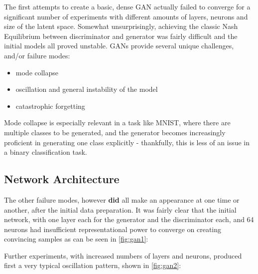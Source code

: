 The first attempts to create a basic, dense \ac{GAN} actually failed to converge for a significant number of experiments with different amounts of layers, neurons and size of the latent space. Somewhat unsurprisingly, achieving the classic Nash Equilibrium between discriminator and generator was fairly difficult and the initial models all proved unstable. \acp{GAN} provide several unique challenges, and/or failure modes:

\begin{itemize}
	\item mode collapse \cite{mode_collapse}
	\item oscillation and general instability of the model \cite{gan_continual_learning}
	\item catastrophic forgetting \cite{catastrophic_forgetting}
\end{itemize}

Mode collapse is especially relevant in a task like MNIST, where there are multiple classes to be generated, and the generator becomes increasingly proficient in generating one class explicitly - thankfully, this is less of an issue in a binary classification task.

\subsection{Network Architecture}
\label{subsection:architecture}

The other failure modes, however \textbf{did} all make an appearance at one time or another, after the initial data preparation. It was fairly clear that the initial network, with one layer each for the generator and the discriminator each, and 64 neurons had insufficient representational power to converge on creating convincing samples as can be seen in \ref{fig:gan1}:


\pagebreak 

Further experiments, with increased numbers of layers and neurons, produced first a very typical oscillation pattern, shown in \ref{fig:gan2}:
 

